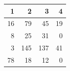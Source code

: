 \begin{tabular}{rrrr}
\toprule
1 & 2 & 3 & 4 \\
\midrule
16 & 79 & 45 & 19 \\
8 & 25 & 31 & 0 \\
3 & 145 & 137 & 41 \\
78 & 18 & 12 & 0 \\
\bottomrule
\end{tabular}
